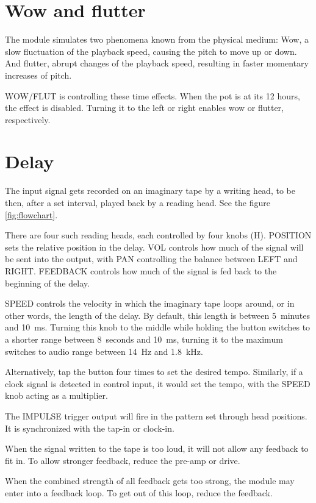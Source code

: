 \documentclass[11pt]{article}
\begin{document}
\begin{minipage}{0.05\textwidth}
\phantom{ }
\end{minipage}%
\begin{minipage}[t]{0.45\textwidth}
\setlength{\parskip}{6pt}

\section{Wow and flutter}

The module simulates two phenomena known from the physical medium:
Wow, a slow fluctuation of the playback speed, causing the pitch to move up or
down.
And flutter, abrupt changes of the playback speed, resulting in faster momentary
increases of pitch.

WOW/FLUT is controlling these time effects. When the pot is at its 12 hours, the
effect is disabled. Turning it to the left or right enables wow or flutter,
respectively.

\section{Delay}

The input signal gets recorded on an imaginary tape by a writing head, to be
then, after a set interval, played back by a reading head. See the figure 
\ref{fig:flowchart}.

There are four such reading heads, each controlled by four knobs (H). POSITION
sets the relative position in the delay. VOL controls how much of the signal
will be sent into the output, with PAN controlling the balance between LEFT and
RIGHT. FEEDBACK controls how much of the signal is fed back to the beginning of
the delay.

SPEED controls the velocity in which the imaginary tape loops around, or in
other words, the length of the delay. By default, this length is between
5~minutes and 10~ms. Turning this knob to the middle while holding the button
switches to a shorter range between 8~seconds and 10~ms, turning it to the
maximum switches to audio range between 14~Hz and 1.8~kHz.

Alternatively, tap the button four times to set the desired tempo.
Similarly, if a clock signal is detected in control input, it would set the
tempo, with the SPEED knob acting as a multiplier.

The IMPULSE trigger output will fire in the pattern set through head positions.
It is synchronized with the tap-in or clock-in.

When the signal written to the tape is too loud, it will not allow any feedback
to fit in. To allow stronger feedback, reduce the pre-amp or drive.

When the combined strength of all feedback gets too strong, the module may enter
into a feedback loop. To get out of this loop, reduce the feedback.

\end{minipage}
\end{document}
